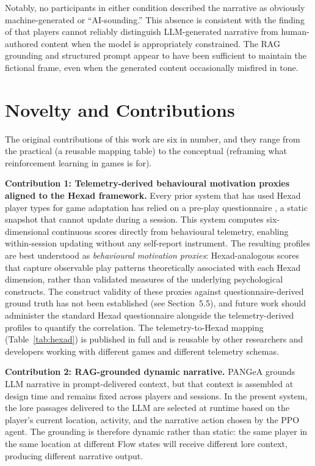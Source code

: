 Notably, no participants in either condition described the narrative as obviously machine-generated or ``AI-sounding.'' This absence is consistent with the finding of \citet{ligs2025chi} that players cannot reliably distinguish LLM-generated narrative from human-authored content when the model is appropriately constrained. The RAG grounding and structured prompt appear to have been sufficient to maintain the fictional frame, even when the generated content occasionally misfired in tone.

\section{Novelty and Contributions}

The original contributions of this work are six in number, and they range from the practical (a reusable mapping table) to the conceptual (reframing what reinforcement learning in games is for).

\textbf{Contribution 1: Telemetry-derived behavioural motivation proxies aligned to the Hexad framework.} Every prior system that has used Hexad player types for game adaptation has relied on a pre-play questionnaire \citep{tondello2016hexad}, a static snapshot that cannot update during a session. This system computes six-dimensional continuous scores directly from behavioural telemetry, enabling within-session updating without any self-report instrument. The resulting profiles are best understood as \textit{behavioural motivation proxies}: Hexad-analogous scores that capture observable play patterns theoretically associated with each Hexad dimension, rather than validated measures of the underlying psychological constructs. The construct validity of these proxies against questionnaire-derived ground truth has not been established (see Section~5.5), and future work should administer the standard Hexad questionnaire alongside the telemetry-derived profiles to quantify the correlation. The telemetry-to-Hexad mapping (Table~\ref{tab:hexad}) is published in full and is reusable by other researchers and developers working with different games and different telemetry schemas.

\textbf{Contribution 2: RAG-grounded dynamic narrative.} PANGeA \citep{todd2024pangea} grounds LLM narrative in prompt-delivered context, but that context is assembled at design time and remains fixed across players and sessions. In the present system, the lore passages delivered to the LLM are selected at runtime based on the player's current location, activity, and the narrative action chosen by the PPO agent. The grounding is therefore dynamic rather than static: the same player in the same location at different Flow states will receive different lore context, producing different narrative output.

